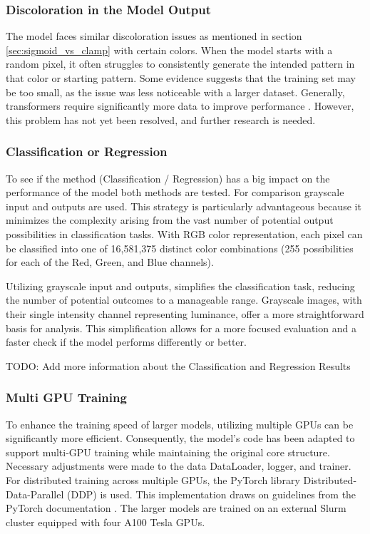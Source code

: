     \subsubsection{Discoloration in the Model Output}
    
    The model faces similar discoloration issues as mentioned in section \autoref{sec:sigmoid_vs_clamp} with certain colors. When the model starts with a random pixel, it often struggles to consistently generate the intended pattern in that color or starting pattern. Some evidence suggests that the training set may be too small, as the issue was less noticeable with a larger dataset. Generally, transformers require significantly more data to improve performance \autocite{chen2022dearkd}. However, this problem has not yet been resolved, and further research is needed.

    \subsubsection{Classification or Regression}

    To see if the method (Classification / Regression) has a big impact on the performance of the model both methods are tested. For comparison grayscale input and outputs are used. This strategy is particularly advantageous because it minimizes the complexity arising from the vast number of potential output possibilities in classification tasks. With RGB color representation, each pixel can be classified into one of 16,581,375 distinct color combinations (255 possibilities for each of the Red, Green, and Blue channels).

    Utilizing grayscale input and outputs, simplifies the classification task, reducing the number of potential outcomes to a manageable range. Grayscale images, with their single intensity channel representing luminance, offer a more straightforward basis for analysis. This simplification allows for a more focused evaluation and a faster check if the model performs differently or better.

    TODO: Add more information about the Classification and Regression Results
        
    \subsubsection{Multi GPU Training}
    To enhance the training speed of larger models, utilizing multiple GPUs can be significantly more efficient. Consequently, the model's code has been adapted to support multi-GPU training while maintaining the original core structure. Necessary adjustments were made to the data DataLoader, logger, and trainer. For distributed training across multiple GPUs, the PyTorch library Distributed-Data-Parallel (DDP) is used. This implementation draws on guidelines from the PyTorch documentation \autocite{Subramanian2023}. The larger models are trained on an external Slurm cluster equipped with four A100 Tesla GPUs.